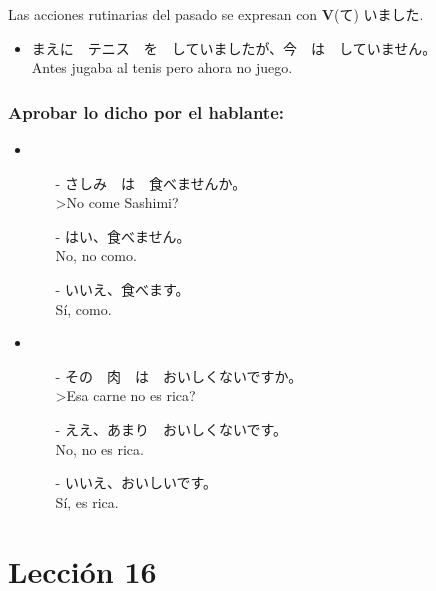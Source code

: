 \documentclass[a4paper,12pt,oneside]{report}
\def\bv{\textbf{V}} %
\begin{document}
\begin{CJK*}{UTF8}{min}
        Las acciones rutinarias del pasado se expresan con \bv(て) いました.

        \begin{itemize}
          \item まえに　テニス　を　していましたが、今　は　していません。\\
                Antes jugaba al tenis pero ahora no juego.
        \end{itemize}

      \subsubsection{Aprobar lo dicho por el hablante:}

        \begin{itemize}
          \item
            \begin{itemize}
              \item[-] さしみ　は　食べませんか。\\
                       >No come Sashimi?
              \item[-] はい、食べません。\\
                       No, no como.
              \item[-] いいえ、食べます。\\
                       S\'i, como.
            \end{itemize}
          \item
            \begin{itemize}
              \item[-] その　肉　は　おいしくないですか。\\
                       >Esa carne no es rica?
              \item[-] ええ、あまり　おいしくないです。\\
                       No, no es rica.
              \item[-] いいえ、おいしいです。\\
                       S\'i, es rica.
            \end{itemize}
        \end{itemize}


    \section{Lección 16}


\end{CJK*}
\end{document}
